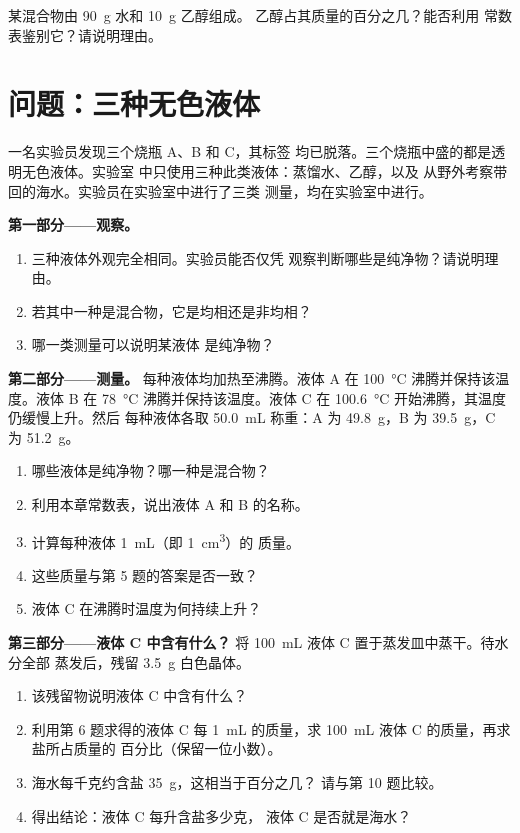 \begin{exercise}[$\star\star\star$]\label{exo:g6:pure-substances-and-mixtures:12}
某混合物由 \qty{90}{g} 水和 \qty{10}{g} 乙醇组成。
乙醇占其质量的百分之几？能否利用
常数表鉴别它？请说明理由。
\end{exercise}

\section{问题：三种无色液体}

\begin{problem}
\label{pb:g6:pure-substances-and-mixtures:1}
一名实验员发现三个烧瓶 A、B 和 C，其标签
均已脱落。三个烧瓶中盛的都是透明无色液体。实验室
中只使用三种此类液体：蒸馏水、乙醇，以及
从野外考察带回的海水。实验员在实验室中进行了三类
测量，均在实验室中进行。

\medskip
\noindent\textbf{第一部分——观察。}
\begin{enumerate}
  \item 三种液体外观完全相同。实验员能否仅凭
        观察判断哪些是纯净物？请说明理由。
  \item 若其中一种是混合物，它是均相还是非均相？
  \item 哪一类测量可以说明某液体
        是纯净物？
\end{enumerate}

\medskip
\noindent\textbf{第二部分——测量。}
每种液体均加热至沸腾。液体 A 在
\qty{100}{\celsius} 沸腾并保持该温度。液体 B 在
\qty{78}{\celsius} 沸腾并保持该温度。液体 C 在
\qty{100.6}{\celsius} 开始沸腾，其温度仍缓慢上升。然后
每种液体各取 \qty{50.0}{mL} 称重：A 为
\qty{49.8}{g}，B 为 \qty{39.5}{g}，C 为 \qty{51.2}{g}。
\begin{enumerate}[resume]
  \item 哪些液体是纯净物？哪一种是混合物？
  \item 利用本章常数表，说出液体 A 和
        B 的名称。
  \item 计算每种液体 \qty{1}{mL}（即 \qty{1}{cm^3}）的
        质量。
  \item 这些质量与第 5 题的答案是否一致？
  \item 液体 C 在沸腾时温度为何持续上升？
\end{enumerate}

\medskip
\noindent\textbf{第三部分——液体 C 中含有什么？}
将 \qty{100}{mL} 液体 C 置于蒸发皿中蒸干。待水分全部
蒸发后，残留 \qty{3.5}{g} 白色晶体。
\begin{enumerate}[resume]
  \item 该残留物说明液体 C 中含有什么？
  \item 利用第 6 题求得的液体 C 每 \qty{1}{mL} 的质量，求
        \qty{100}{mL} 液体 C 的质量，再求盐所占质量的
        百分比（保留一位小数）。
  \item 海水每千克约含盐 \qty{35}{g}，这相当于百分之几？
        请与第 10 题比较。
  \item 得出结论：液体 C 每升含盐多少克，
        液体 C 是否就是海水？
\end{enumerate}
\end{problem}
